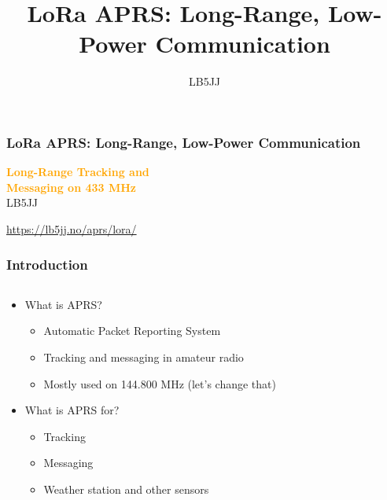 \documentclass[aspectratio=169]{beamer}
\title[LoRa APRS: Long-Range, Low-Power Communication]{LoRa APRS: Long-Range, Low-Power Communication}
\author{LB5JJ}
\begin{document}
\begin{frame}
  \frametitle{LoRa APRS: Long-Range, Low-Power Communication}
  \begin{center}
    {\Huge \textbf{\textcolor{orange}{Long-Range Tracking and\\Messaging on 433 MHz}}} \\[1cm]
    {\Large \textcolor{light}{LB5JJ}}
  \end{center}
  \begin{center}
    {\Large \textcolor{light}{\url{https://lb5jj.no/aprs/lora/}}}
  \end{center}
\end{frame}

\begin{frame}[t]
  \frametitle{Introduction}
  \begin{columns}
    \begin{column}{0.66\textwidth}
      \begin{itemize}
        \item What is APRS?
        \medskip
        \begin{itemize}
          \item Automatic Packet Reporting System
          \medskip
          \item Tracking and messaging in amateur radio
          \medskip
          \item Mostly used on 144.800 MHz (let's change that)
        \end{itemize}
        \medskip
        \item What is APRS for?
        \medskip
        \begin{itemize}
          \item Tracking
          \medskip
          \item Messaging
          \medskip
          \item Weather station and other sensors
        \end{itemize}
      \end{itemize}
    \end{column}
    \begin{column}{0.33\textwidth}
\end{column}
\end{columns}
\end{frame}
\end{document}
